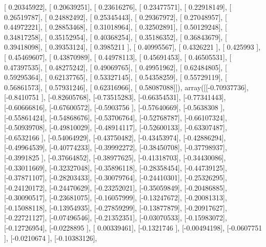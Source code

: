 \documentclass{article}
\begin{document}
       [ 0.20345922],
       [ 0.20639251],
       [ 0.23616276],
       [ 0.23477571],
       [ 0.22918149],
       [ 0.26519787],
       [ 0.24882492],
       [ 0.25345443],
       [ 0.29367972],
       [ 0.27048957],
       [ 0.44972221],
       [ 0.28853468],
       [ 0.31018964],
       [ 0.32502891],
       [ 0.50129248],
       [ 0.34817258],
       [ 0.35152954],
       [ 0.40368254],
       [ 0.35186352],
       [ 0.36843679],
       [ 0.39418098],
       [ 0.39353124],
       [ 0.3985211 ],
       [ 0.40995567],
       [ 0.4326221 ],
       [ 0.425993  ],
       [ 0.45469607],
       [ 0.43870989],
       [ 0.44978113],
       [ 0.45691453],
       [ 0.46505531],
       [ 0.47397535],
       [ 0.48275242],
       [ 0.49069765],
       [ 0.49951962],
       [ 0.62484805],
       [ 0.59295364],
       [ 0.62137765],
       [ 0.53327145],
       [ 0.54358259],
       [ 0.55729119],
       [ 0.56861573],
       [ 0.57931246],
       [ 0.62316966],
       [ 0.58087088]]), array([[-0.70937736],
       [-0.8410751 ],
       [-0.82605768],
       [-0.73515283],
       [-0.66354531],
       [-0.77341443],
       [-0.60666816],
       [-0.67600572],
       [-0.5903756 ],
       [-0.57640669],
       [-0.5638308 ],
       [-0.55861424],
       [-0.54868676],
       [-0.53706764],
       [-0.52768787],
       [-0.66107324],
       [-0.50939708],
       [-0.49810029],
       [-0.48914117],
       [-0.52600133],
       [-0.63307487],
       [-0.6532166 ],
       [-0.54064929],
       [-0.43750482],
       [-0.43453974],
       [-0.42886294],
       [-0.49964539],
       [-0.40774233],
       [-0.39992272],
       [-0.38450708],
       [-0.37798937],
       [-0.3991825 ],
       [-0.37664852],
       [-0.38977625],
       [-0.41318703],
       [-0.34430086],
       [-0.33011669],
       [-0.32327048],
       [-0.35896118],
       [-0.28358454],
       [-0.44739125],
       [-0.37871107],
       [-0.28203433],
       [-0.30079764],
       [-0.24410301],
       [-0.25326295],
       [-0.24120172],
       [-0.24470629],
       [-0.23252021],
       [-0.35059849],
       [-0.20486885],
       [-0.30090517],
       [-0.23681075],
       [-0.16057999],
       [-0.13247672],
       [-0.20081313],
       [-0.15088118],
       [-0.13954935],
       [-0.27859299],
       [-0.13877879],
       [-0.20917627],
       [-0.22721127],
       [-0.07496546],
       [-0.21352351],
       [-0.03070533],
       [-0.15983072],
       [-0.12726954],
       [-0.0228895 ],
       [ 0.00339461],
       [-0.1321746 ],
       [-0.00494198],
       [-0.0607751 ],
       [-0.0210674 ],
       [-0.10383126],
\end{document}
